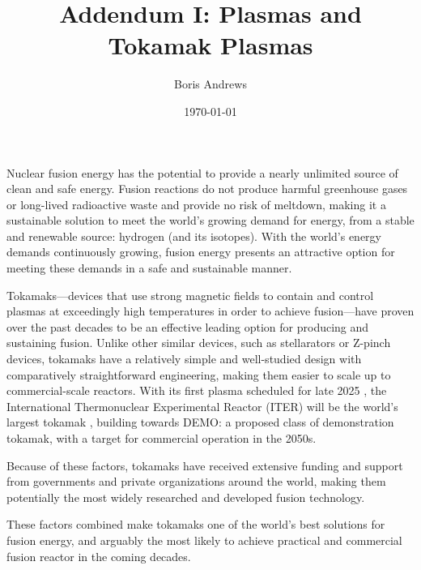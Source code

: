\documentclass[12pt, a4paper]{article}
\title{Addendum I: Plasmas and Tokamak Plasmas}
\author{Boris Andrews}
\affil{Mathematical Institute, University of Oxford}
\date{\today}
\begin{document}
    \maketitle
    
    
    \tableofcontents
    \line


    Nuclear fusion energy has the potential to provide a nearly unlimited source of clean and safe energy. Fusion reactions do not produce harmful greenhouse gases or long-lived radioactive waste and provide no risk of meltdown, making it a sustainable solution to meet the world's growing demand for energy, from a stable and renewable source: hydrogen (and its isotopes). With the world's energy demands continuously growing, fusion energy presents an attractive option for meeting these demands in a safe and sustainable manner.

    \shortline

    Tokamaks---devices that use strong magnetic fields to contain and control plasmas at exceedingly high temperatures in order to achieve fusion---have proven over the past decades to be an effective leading option for producing and sustaining fusion. Unlike other similar devices, such as stellarators or Z-pinch devices, tokamaks have a relatively simple and well-studied  design with comparatively straightforward engineering, making them easier to scale up to commercial-scale reactors. With its first plasma scheduled for late 2025 \cite{ITER_schedule}, the International Thermonuclear Experimental Reactor (ITER) will be the world's largest tokamak \cite{Meade_2009, ITER_plan}, building towards DEMO: a proposed class of demonstration tokamak, with a target for commercial operation in the 2050s.
    
    Because of these factors, tokamaks have received extensive funding and support from governments and private organizations around the world, making them potentially the most widely researched and developed fusion technology.
    
    These factors combined make tokamaks one of the world's best solutions for fusion energy, and arguably the most likely to achieve practical and commercial fusion reactor in the coming decades.
\end{document}
